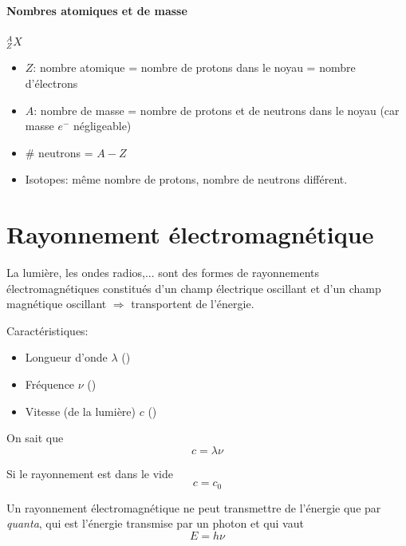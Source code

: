 \documentclass[11pt,a4paper,french]{article}
\newcommand\sorb{\mathrm{s}}
\newcommand\dorb{\mathrm{d}}
\begin{document}

\paragraph{Nombres atomiques et de masse}

\emph{$^{A}_{Z}X$}
\begin{itemize}
	\item $Z$: nombre atomique = nombre de protons dans le noyau = nombre d'électrons
	\item $A$: nombre de masse = nombre de protons et de neutrons dans le noyau (car masse $e^{-}$ négligeable)
	\item \# neutrons = $A-Z$
	\item Isotopes: même nombre de protons, nombre de neutrons différent.
\end{itemize}

\section{Rayonnement électromagnétique}

La lumière, les ondes radios,... sont des formes de rayonnements électromagnétiques constitués d'un champ électrique oscillant et d'un champ magnétique oscillant $\Rightarrow$ transportent de l'énergie.

Caractéristiques:
\begin{itemize}
	\item Longueur d'onde $\lambda$ (\meter)
	\item Fréquence $\nu$ (\hertz)
	\item Vitesse (de la lumière) $c$ (\meter\per\second)
\end{itemize}

On sait que
\[ c = \lambda \nu \]

Si le rayonnement est dans le vide
\[ c = c_0 \]

Un rayonnement électromagnétique ne peut transmettre de l'énergie que par {\it quanta}, qui est l'énergie transmise par un photon et qui vaut
\[ E = h\nu \]
\end{document}
